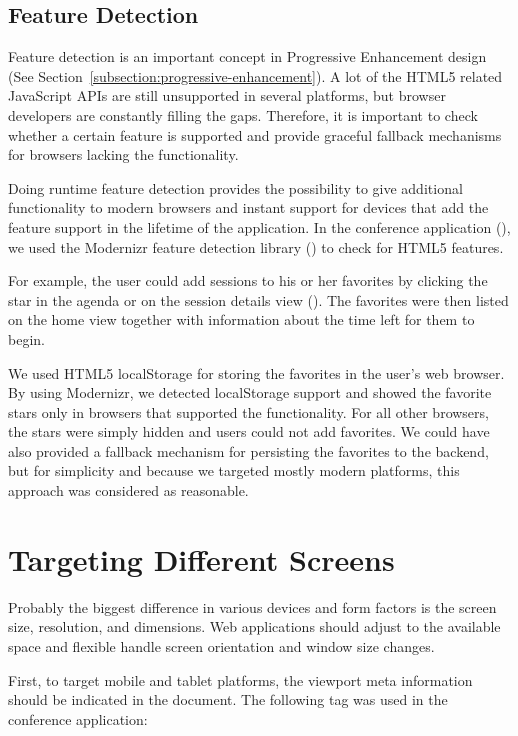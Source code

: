 \subsection{Feature Detection}

Feature detection is an important concept in Progressive Enhancement
design (See Section~\ref{subsection:progressive-enhancement}). A lot
of the HTML5 related JavaScript APIs are still unsupported in several
platforms, but browser developers are constantly filling the
gaps. Therefore, it is important to check whether a certain feature is
supported and provide graceful fallback mechanisms for browsers
lacking the functionality.

Doing runtime feature detection provides the possibility to give
additional functionality to modern browsers and instant support for
devices that add the feature support in the lifetime of the
application. In the conference application (), we
used the Modernizr feature detection library () to check for HTML5 features.

For example, the user could add sessions to his or her favorites by
clicking the star in the agenda or on the session details view
(). The favorites were then listed on the home
view together with information about the time left for them to begin.

We used HTML5 localStorage for storing the favorites in the user's web
browser. By using Modernizr, we detected localStorage support and
showed the favorite stars only in browsers that supported the
functionality. For all other browsers, the stars were simply hidden
and users could not add favorites. We could have also provided a
fallback mechanism for persisting the favorites to the backend, but
for simplicity and because we targeted mostly modern platforms, this
approach was considered as reasonable.

\section{Targeting Different Screens}
\label{section:targeting-screens}

Probably the biggest difference in various devices and form factors is
the screen size, resolution, and dimensions. Web applications should
adjust to the available space and flexible handle screen orientation
and window size changes.

First, to target mobile and tablet platforms, the viewport meta
information should be indicated in the document. The following tag was
used in the conference application:

